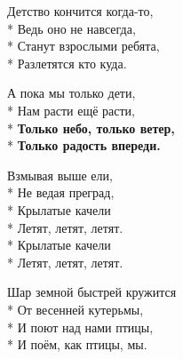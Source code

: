 \medskip

\begin{minipage}{\linewidth}
Детство кончится когда-то,\\*
Ведь оно не навсегда,\\*
Станут взрослыми ребята,\\*
Разлетятся кто куда.\\
\end{minipage}\par\medskip\nobreak

\medskip

\begin{minipage}{\linewidth}
А пока мы только дети,\\*
Нам расти ещё расти,\\*
\textbf{Только небо, только ветер,}\\*
\textbf{Только радость впереди.}\\
\end{minipage}\par\medskip\nobreak

\medskip

\begin{minipage}{\linewidth}
\hspace*{1.5em}Взмывая выше ели,\\*
\hspace*{1.5em}Не ведая преград,\\*
\hspace*{1.5em}Крылатые качели\\*
\hspace*{1.5em}Летят, летят, летят.\\*
\hspace*{1.5em}Крылатые качели\\*
\hspace*{1.5em}Летят, летят, летят.\\
\end{minipage}\par\medskip\nobreak

\medskip

\begin{minipage}{\linewidth}
Шар земной быстрей кружится\\*
От весенней кутерьмы,\\*
И поют над нами птицы,\\*
И поём, как птицы, мы.\\
\end{minipage}\par\medskip\nobreak

